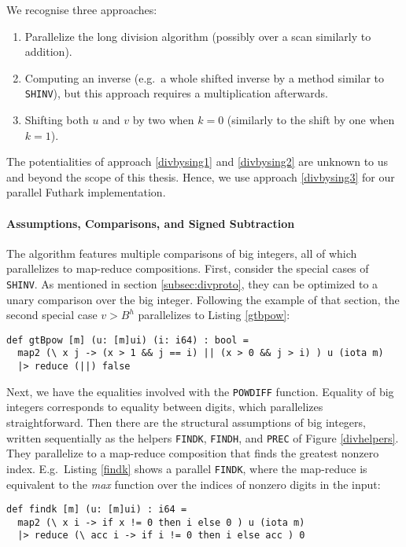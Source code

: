 We recognise three approaches:
\begin{enumerate}
\item Parallelize the long division algorithm (possibly over a scan similarly to
  addition).\label{divbysing1}
\item Computing an inverse (e.g.\ a whole shifted inverse by a method similar to
  \texttt{SHINV}), but this approach requires a multiplication
  afterwards.\label{divbysing2}
\item Shifting both $u$ and $v$ by two when $k = 0$ (similarly to the shift by
  one when $k=1$).\label{divbysing3}
\end{enumerate}

The potentialities of approach \ref{divbysing1} and \ref{divbysing2} are unknown
to us and beyond the scope of this thesis. Hence, we use approach
\ref{divbysing3} for our parallel Futhark implementation.

\paragraph{Assumptions, Comparisons, and Signed Subtraction}
The algorithm features multiple comparisons of big integers, all of which
parallelizes to map-reduce compositions. First, consider the special cases of
\texttt{SHINV}. As mentioned in section \ref{subsec:divproto}, they can be
optimized to a unary comparison over the big integer. Following the example of
that section, the second special case $v > B^h$ parallelizes to Listing
\ref{gtbpow}:
\begin{lstlisting}[language=futhark,caption={\footnotesize Futhark function to check $u > B^i$ in parallel for big integer $u$ in base $B$ from file \texttt{div.fut}.},label={gtbpow},firstnumber=29]
def gtBpow [m] (u: [m]ui) (i: i64) : bool =
  map2 (\ x j -> (x > 1 && j == i) || (x > 0 && j > i) ) u (iota m)
  |> reduce (||) false
\end{lstlisting}
Next, we have the equalities involved with the \texttt{POWDIFF}
function. Equality of big integers corresponds to equality between digits, which
parallelizes straightforward. Then there are the structural assumptions of big
integers, written sequentially as the helpers \texttt{FINDK}, \texttt{FINDH},
and \texttt{PREC} of Figure \ref{divhelpers}. They parallelize to a map-reduce
composition that finds the greatest nonzero index. E.g.\ Listing \ref{findk}
shows a parallel \texttt{FINDK}, where the map-reduce is equivalent to the
\textit{max} function over the indices of nonzero digits in the input:
\begin{lstlisting}[language=futhark,caption={\footnotesize Futhark function to find $i$ for big integer $u$ in base $B$ s.t.\ $B^i \leq u < B^{i+1}$ from file \texttt{div.fut}.},label={findk},firstnumber=39]
def findk [m] (u: [m]ui) : i64 =
  map2 (\ x i -> if x != 0 then i else 0 ) u (iota m)
  |> reduce (\ acc i -> if i != 0 then i else acc ) 0
\end{lstlisting}

